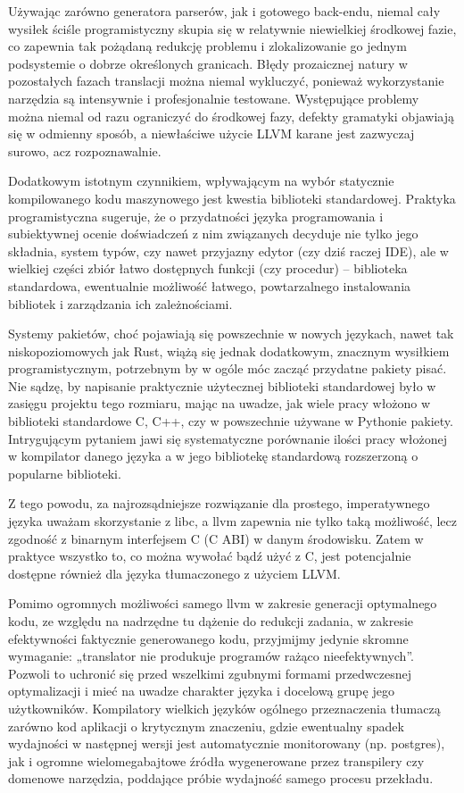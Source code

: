 Używając zarówno generatora parserów, jak i gotowego back-endu, niemal cały wysiłek ściśle programistyczny skupia się w relatywnie niewielkiej środkowej fazie, co zapewnia tak pożądaną redukcję problemu i zlokalizowanie go jednym podsystemie o dobrze określonych granicach. Błędy prozaicznej natury w pozostałych fazach translacji można niemal wykluczyć, ponieważ wykorzystanie narzędzia są intensywnie i profesjonalnie testowane. Występujące problemy można niemal od razu ograniczyć do środkowej fazy, defekty gramatyki objawiają się w odmienny sposób, a niewłaściwe użycie LLVM karane jest zazwyczaj surowo, acz rozpoznawalnie. 

Dodatkowym istotnym czynnikiem, wpływającym na wybór statycznie kompilowanego kodu maszynowego jest kwestia biblioteki standardowej. Praktyka programistyczna sugeruje, że o przydatności języka programowania i subiektywnej ocenie doświadczeń z nim związanych decyduje nie tylko jego składnia, system typów, czy nawet przyjazny edytor (czy dziś raczej IDE), ale w wielkiej części zbiór łatwo dostępnych funkcji (czy procedur) – biblioteka standardowa, ewentualnie możliwość łatwego, powtarzalnego instalowania bibliotek i zarządzania ich zależnościami.

Systemy pakietów, choć pojawiają się powszechnie w nowych językach, nawet tak niskopoziomowych jak Rust, wiążą się jednak dodatkowym, znacznym wysiłkiem programistycznym, potrzebnym by w ogóle móc zacząć przydatne pakiety pisać. Nie sądzę, by napisanie praktycznie użytecznej biblioteki standardowej było w zasięgu projektu tego rozmiaru, mając na uwadze, jak wiele pracy włożono w biblioteki standardowe C, C++, czy w powszechnie używane w Pythonie pakiety. Intrygującym pytaniem jawi się systematyczne porównanie ilości pracy włożonej w kompilator danego języka a w jego bibliotekę standardową rozszerzoną o popularne biblioteki.

Z tego powodu, za najrozsądniejsze rozwiązanie dla prostego, imperatywnego języka uważam skorzystanie z libc, a llvm zapewnia nie tylko taką możliwość, lecz zgodność z binarnym interfejsem C (C ABI) w danym środowisku. Zatem w praktyce wszystko to, co można wywołać bądź użyć z C, jest potencjalnie dostępne również dla języka tłumaczonego z użyciem LLVM.

Pomimo ogromnych możliwości samego llvm w zakresie generacji optymalnego kodu, ze względu na nadrzędne tu dążenie do redukcji zadania, w zakresie efektywności faktycznie generowanego kodu, przyjmijmy jedynie skromne wymaganie: „translator nie produkuje programów rażąco nieefektywnych”. Pozwoli to uchronić się przed wszelkimi zgubnymi formami przedwczesnej optymalizacji i mieć na uwadze charakter języka i docelową grupę jego użytkowników. Kompilatory wielkich języków ogólnego przeznaczenia tłumaczą zarówno kod aplikacji o krytycznym znaczeniu, gdzie ewentualny spadek wydajności w następnej wersji jest automatycznie monitorowany (np. postgres\cite{postgres_regression_testing}), jak i ogromne wielomegabajtowe źródła  wygenerowane przez transpilery czy domenowe narzędzia, poddające próbie wydajność samego procesu przekładu.

